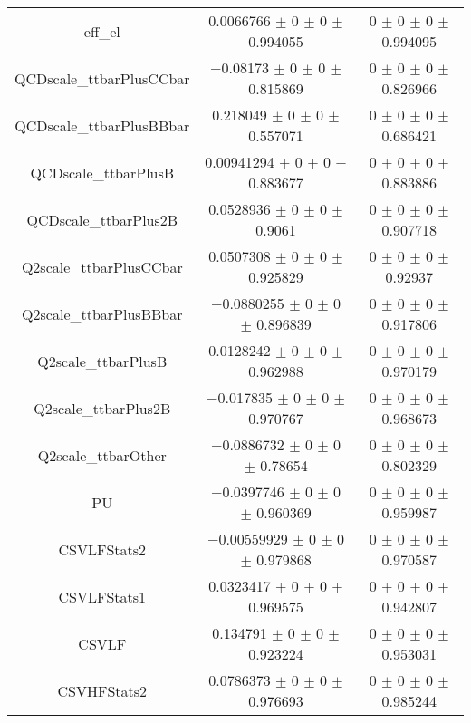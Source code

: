 \begin{table}
\begin{tabular}{ccc}
eff\_el & \num{0.0066766} $\pm$ \num{0} $\pm$ \num{0} $\pm$ \num{0.994055} & \num{0} $\pm$ \num{0} $\pm$ \num{0} $\pm$ \num{0.994095}\\
QCDscale\_ttbarPlusCCbar & \num{-0.08173} $\pm$ \num{0} $\pm$ \num{0} $\pm$ \num{0.815869} & \num{0} $\pm$ \num{0} $\pm$ \num{0} $\pm$ \num{0.826966}\\
QCDscale\_ttbarPlusBBbar & \num{0.218049} $\pm$ \num{0} $\pm$ \num{0} $\pm$ \num{0.557071} & \num{0} $\pm$ \num{0} $\pm$ \num{0} $\pm$ \num{0.686421}\\
QCDscale\_ttbarPlusB & \num{0.00941294} $\pm$ \num{0} $\pm$ \num{0} $\pm$ \num{0.883677} & \num{0} $\pm$ \num{0} $\pm$ \num{0} $\pm$ \num{0.883886}\\
QCDscale\_ttbarPlus2B & \num{0.0528936} $\pm$ \num{0} $\pm$ \num{0} $\pm$ \num{0.9061} & \num{0} $\pm$ \num{0} $\pm$ \num{0} $\pm$ \num{0.907718}\\
Q2scale\_ttbarPlusCCbar & \num{0.0507308} $\pm$ \num{0} $\pm$ \num{0} $\pm$ \num{0.925829} & \num{0} $\pm$ \num{0} $\pm$ \num{0} $\pm$ \num{0.92937}\\
Q2scale\_ttbarPlusBBbar & \num{-0.0880255} $\pm$ \num{0} $\pm$ \num{0} $\pm$ \num{0.896839} & \num{0} $\pm$ \num{0} $\pm$ \num{0} $\pm$ \num{0.917806}\\
Q2scale\_ttbarPlusB & \num{0.0128242} $\pm$ \num{0} $\pm$ \num{0} $\pm$ \num{0.962988} & \num{0} $\pm$ \num{0} $\pm$ \num{0} $\pm$ \num{0.970179}\\
Q2scale\_ttbarPlus2B & \num{-0.017835} $\pm$ \num{0} $\pm$ \num{0} $\pm$ \num{0.970767} & \num{0} $\pm$ \num{0} $\pm$ \num{0} $\pm$ \num{0.968673}\\
Q2scale\_ttbarOther & \num{-0.0886732} $\pm$ \num{0} $\pm$ \num{0} $\pm$ \num{0.78654} & \num{0} $\pm$ \num{0} $\pm$ \num{0} $\pm$ \num{0.802329}\\
PU & \num{-0.0397746} $\pm$ \num{0} $\pm$ \num{0} $\pm$ \num{0.960369} & \num{0} $\pm$ \num{0} $\pm$ \num{0} $\pm$ \num{0.959987}\\
CSVLFStats2 & \num{-0.00559929} $\pm$ \num{0} $\pm$ \num{0} $\pm$ \num{0.979868} & \num{0} $\pm$ \num{0} $\pm$ \num{0} $\pm$ \num{0.970587}\\
CSVLFStats1 & \num{0.0323417} $\pm$ \num{0} $\pm$ \num{0} $\pm$ \num{0.969575} & \num{0} $\pm$ \num{0} $\pm$ \num{0} $\pm$ \num{0.942807}\\
CSVLF & \num{0.134791} $\pm$ \num{0} $\pm$ \num{0} $\pm$ \num{0.923224} & \num{0} $\pm$ \num{0} $\pm$ \num{0} $\pm$ \num{0.953031}\\
CSVHFStats2 & \num{0.0786373} $\pm$ \num{0} $\pm$ \num{0} $\pm$ \num{0.976693} & \num{0} $\pm$ \num{0} $\pm$ \num{0} $\pm$ \num{0.985244}\\

\end{tabular}
\end{table}
